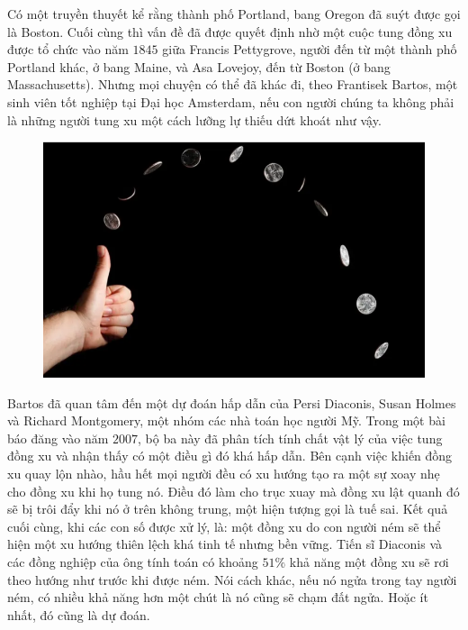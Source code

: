 \begin{multicols}{2}
	Có một truyền thuyết  kể rằng thành phố Portland, bang Oregon đã suýt được gọi là Boston. Cuối cùng thì vấn đề đã được quyết định nhờ một cuộc tung đồng xu được tổ chức vào năm $1845$ giữa Francis Pettygrove, người đến từ một thành phố Portland khác, ở bang Maine, và Asa Lovejoy, đến từ Boston (ở bang Massachusetts). Nhưng mọi chuyện có thể đã khác đi, theo Frantisek Bartos, một sinh viên tốt nghiệp tại Đại học Amsterdam, nếu con người chúng ta  không phải là những người tung xu một cách lưỡng lự thiếu dứt khoát như vậy.
	\begin{figure}[H]
		\vspace*{-5pt}
		\centering
		\captionsetup{labelformat= empty, justification=centering}
		\includegraphics[width= 1\linewidth]{1111}
		\vspace*{-15pt}
	\end{figure}
	Bartos đã quan tâm đến một dự đoán hấp dẫn của Persi Diaconis, Susan Holmes và Richard Montgomery, một nhóm các nhà toán học người Mỹ. Trong một bài báo đăng vào năm $2007$, bộ ba này đã phân tích tính chất vật lý của việc tung đồng xu và nhận thấy có một điều gì đó khá hấp dẫn. Bên cạnh việc khiến đồng xu quay lộn nhào, hầu hết mọi người đều có xu hướng tạo ra một sự xoay nhẹ cho đồng xu khi họ tung nó. Điều đó làm cho trục xuay mà đồng xu lật quanh đó sẽ bị trôi đẩy khi nó ở trên không trung, một hiện tượng gọi là tuế sai.
	\vskip 0.1cm
	Kết quả cuối cùng, khi các con số được xử lý, là: một đồng xu do con người ném sẽ thể hiện một xu hướng thiên lệch khá tinh tế nhưng bền vững. Tiến sĩ Diaconis và các đồng nghiệp của ông tính toán có khoảng $51\%$ khả năng một đồng xu sẽ rơi theo hướng như trước khi được ném. Nói cách khác, nếu nó ngửa trong tay người ném, có nhiều khả năng hơn một chút là nó cũng sẽ chạm đất ngửa. Hoặc ít nhất, đó cũng là dự đoán.

\end{multicols}
